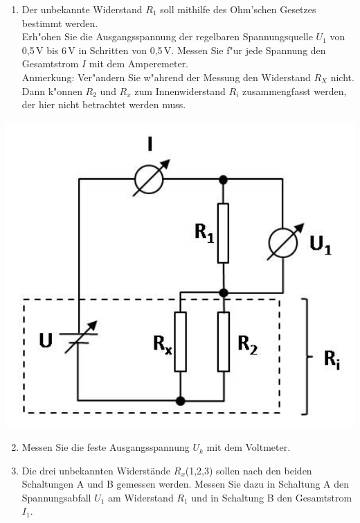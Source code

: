 \begin{minipage}{0.6\textwidth}
 \begin{enumerate}
  \item Der unbekannte Widerstand $R_1$ soll mithilfe des Ohm'schen Gesetzes bestimmt werden.\\
   Erh"ohen Sie die Ausgangsspannung der regelbaren Spannungsquelle $U_1$ von 0,5\,V bis 6\,V in Schritten von 0,5\,V. Messen Sie f"ur jede Spannung den Gesamtstrom $I$ mit dem Amperemeter.\\
   Anmerkung: Ver"andern Sie w"ahrend der Messung den Widerstand $R_X$ nicht. Dann k"onnen $R_2$ und $R_x$ zum Innenwiderstand $R_i$ zusammengfasst werden, der hier nicht betrachtet werden muss.
 \end{enumerate}
\end{minipage}
%
\begin{minipage}{0.35\textwidth}
 \includegraphics[width=1.00\textwidth]{Versuch_13-14/Abbildungen/Schaltung1.jpg}
 \label{fig:Schaltung1}
\end{minipage}

\begin{enumerate} \setcounter{enumi}{1}
 \item Messen Sie die feste Ausgangsspannung $U_k$ mit dem Voltmeter.
 \item Die drei unbekannten Widerstände $R_x$(1,2,3) sollen nach den beiden Schaltungen A und B gemessen werden. Messen Sie dazu in Schaltung A den Spannungsabfall $U_1$ am Widerstand $R_1$ und in Schaltung B den Gesamtstrom $I_1$.
\end{enumerate}

